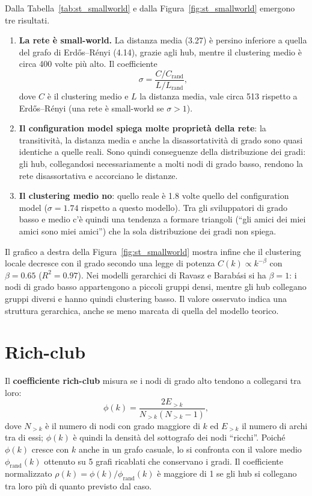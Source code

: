\documentclass[11pt]{report}
\begin{document}
Dalla Tabella~\ref{tab:st_smallworld} e dalla Figura~\ref{fig:st_smallworld}
emergono tre risultati.
\begin{enumerate}
  \item \textbf{La rete è small-world.} La distanza media (\num{3.27}) è persino
        inferiore a quella del grafo di Erdős--Rényi (\num{4.14}), grazie agli hub,
        mentre il clustering medio è circa 400 volte più alto. Il coefficiente
        \[
          \sigma = \frac{C/C_{\text{rand}}}{L/L_{\text{rand}}},
        \]
        dove $C$ è il clustering medio e $L$ la distanza media, vale circa 513
        rispetto a Erdős--Rényi (una rete è small-world se $\sigma>1$).
  \item \textbf{Il configuration model spiega molte proprietà della rete}: la
        transitività, la distanza media e anche la disassortatività di grado sono
        quasi identiche a quelle reali. Sono quindi conseguenze della distribuzione
        dei gradi: gli hub, collegandosi necessariamente a molti nodi di grado
        basso, rendono la rete disassortativa e accorciano le distanze.
  \item \textbf{Il clustering medio no}: quello reale è \num{1.8} volte quello del
        configuration model ($\sigma=\num{1.74}$ rispetto a questo modello). Tra
        gli sviluppatori di grado basso e medio c'è quindi una tendenza a formare
        triangoli (``gli amici dei miei amici sono miei amici'') che la sola
        distribuzione dei gradi non spiega.
\end{enumerate}

Il grafico a destra della Figura~\ref{fig:st_smallworld} mostra infine che il
clustering locale decresce con il grado secondo una legge di potenza
$C(k)\propto k^{-\beta}$ con $\beta=\num{0.65}$ ($R^2=\num{0.97}$). Nei modelli
gerarchici di Ravasz e Barabási si ha $\beta=1$: i nodi di grado basso appartengono
a piccoli gruppi densi, mentre gli hub collegano gruppi diversi e hanno quindi
clustering basso. Il valore osservato indica una struttura gerarchica, anche se meno
marcata di quella del modello teorico.

\section{Rich-club}
\label{sec:st_richclub}

Il \textbf{coefficiente rich-club} misura se i nodi di grado alto tendono a
collegarsi tra loro:
\[
  \phi(k) = \frac{2E_{>k}}{N_{>k}(N_{>k}-1)},
\]
dove $N_{>k}$ è il numero di nodi con grado maggiore di $k$ ed $E_{>k}$ il numero di
archi tra di essi; $\phi(k)$ è quindi la densità del sottografo dei nodi ``ricchi''.
Poiché $\phi(k)$ cresce con $k$ anche in un grafo casuale, lo si confronta con il
valore medio $\phi_{\text{rand}}(k)$ ottenuto su 5 grafi ricablati che conservano i
gradi. Il coefficiente normalizzato $\rho(k)=\phi(k)/\phi_{\text{rand}}(k)$ è
maggiore di 1 se gli hub si collegano tra loro più di quanto previsto dal caso.
\end{document}

